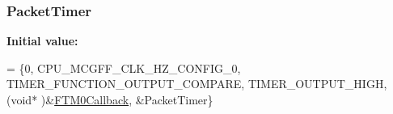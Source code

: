 \subsubsection[{Packet\+Timer}]{ Packet\+Timer}\label{group___main__module_ga304870151b4c57ce2dfcc7af60d3d69d}
{\bfseries Initial value\+:}
\begin{DoxyCode}
= \{0,
                              CPU\_MCGFF\_CLK\_HZ\_CONFIG\_0,
                              TIMER\_FUNCTION\_OUTPUT\_COMPARE,
                              TIMER\_OUTPUT\_HIGH,
                              (\textcolor{keywordtype}{void}* )&\hyperlink{group___main__module_gabb280e64231bb7c73085a48303a9c28f}{FTM0Callback},
                              &PacketTimer\}
\end{DoxyCode}
